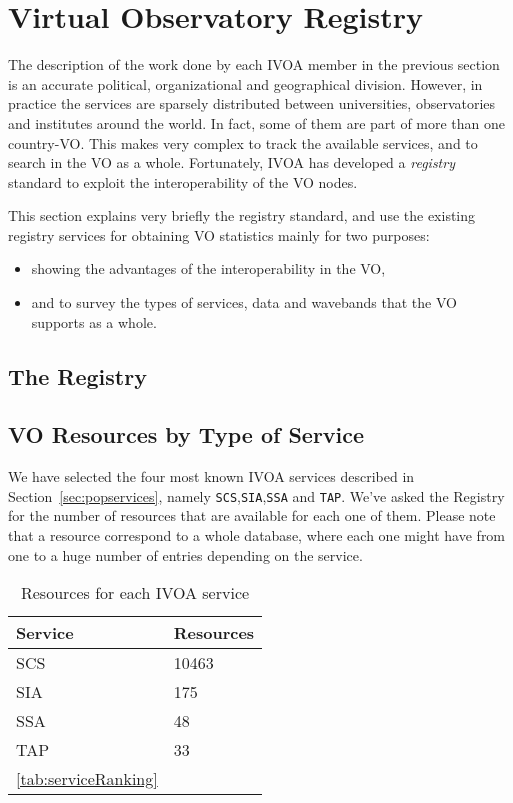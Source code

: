 \section{Virtual Observatory Registry }

The description of the work done by each IVOA member
in the previous section is an accurate political, organizational 
and geographical division. However, in practice the services
are sparsely distributed between universities, observatories
and institutes around the world. In fact, some of them 
are part of more than one country-VO. 
This makes very complex to track the available services, 
and to search in the VO as a whole. Fortunately, 
IVOA has developed a \emph{registry} standard to 
exploit the interoperability of the VO nodes.

This section explains very briefly the registry standard,
and use the existing registry services for obtaining VO 
statistics mainly for two purposes:
\begin{itemize}
\item showing the advantages of the interoperability in the VO,
\item and to survey the types of services, data and wavebands that
the VO supports as a whole.
\end{itemize}

\subsection{The Registry}


\subsection{VO Resources by Type of Service}

We have selected the four most known IVOA services described in Section~\ref{sec:popservices}, namely
\verb+SCS+,\verb+SIA+,\verb+SSA+ and \verb+TAP+. We've asked the Registry for the number of resources 
that are available for each one of them. Please note that a resource correspond to a whole database, where
each one might have from one to a huge number of entries depending on the service. 

\begin{table}
\begin{tabular}{|l|l|}
\hline
\textbf{Service} & \textbf{Resources} \\
\hline
SCS  &  10463  \\
SIA  &  175  \\
SSA  &  48  \\
TAP  &  33  \\
\hline
\caption{Resources for each IVOA service}
\ref{tab:serviceRanking}
\end{tabular}
\end{table}

